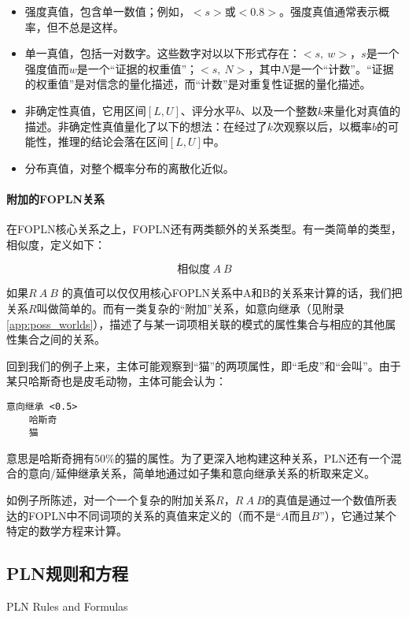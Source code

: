 \begin{itemize}
\item 强度真值，包含单一数值；例如，$<s>$或$<0.8>$。强度真值通常表示概率，但不总是这样。
\item 单一真值，包括一对数字。这些数字对以以下形式存在：$<s,\ w>$，$s$是一个强度值而$w$是一个“证据的权重值”；$<s,\ N>$，其中$N$是一个“计数”。“证据的权重值”是对信念的量化描述，而“计数”是对重复性证据的量化描述。
\item 非确定性真值，它用区间$[L,U]$、评分水平$b$、以及一个整数$k$来量化对真值的描述。非确定性真值量化了以下的想法：在经过了$k$次观察以后，以概率$b$的可能性，推理的结论会落在区间$[L,U]$中。
\item 分布真值，对整个概率分布的离散化近似。
\end{itemize}

\paragraph{附加的FOPLN关系}

在FOPLN核心关系之上，FOPLN还有两类额外的关系类型。有一类简单的类型，相似度，定义如下：

$$
相似度 \ A \ B
$$

如果$R \ A \ B$ 的真值可以仅仅用核心FOPLN关系中A和B的关系来计算的话，我们把关系$R$叫做简单的。而有一类复杂的“附加”关系，如意向继承（见附录\ref{app:poss_worlds}），描述了与某一词项相关联的模式的属性集合与相应的其他属性集合之间的关系。

回到我们的例子上来，主体可能观察到“猫”的两项属性，即“毛皮”和“会叫”。由于某只哈斯奇也是皮毛动物，主体可能会认为：

{\tt\begin{small}\begin{lstlisting}
意向继承 <0.5>
	哈斯奇  
	猫
\end{lstlisting}\end{small}}

意思是哈斯奇拥有50\%的猫的属性。为了更深入地构建这种关系，PLN还有一个混合的意向/延伸继承关系，简单地通过如子集和意向继承关系的析取来定义。

如例子所陈述，对一个一个复杂的附加关系$R$，$R \ A \ B$的真值是通过一个数值所表达的FOPLN中不同词项的关系的真值来定义的（而不是“$A$而且$B$”），它通过某个特定的数学方程来计算。

\subsection{PLN规则和方程}{PLN Rules and Formulas}

